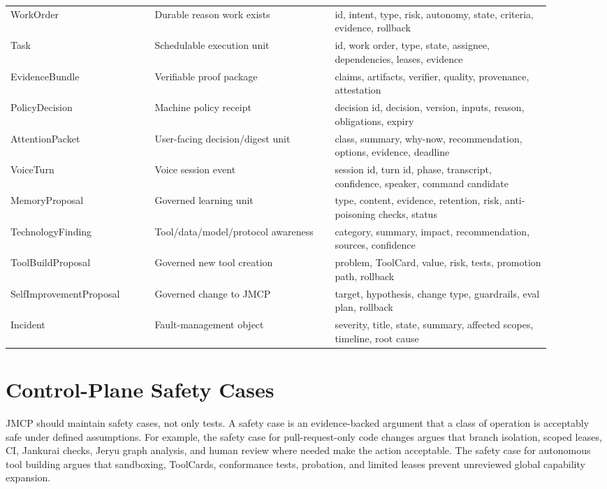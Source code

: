 \documentclass[10pt,journal,onecolumn]{IEEEtran}
\begin{document}
\begin{longtable}{@{}p{0.24\linewidth}p{0.30\linewidth}p{0.36\linewidth}@{}}
WorkOrder & Durable reason work exists & id, intent, type, risk, autonomy, state, criteria, evidence, rollback \\
Task & Schedulable execution unit & id, work order, type, state, assignee, dependencies, leases, evidence \\
EvidenceBundle & Verifiable proof package & claims, artifacts, verifier, quality, provenance, attestation \\
PolicyDecision & Machine policy receipt & decision id, decision, version, inputs, reason, obligations, expiry \\
AttentionPacket & User-facing decision/digest unit & class, summary, why-now, recommendation, options, evidence, deadline \\
VoiceTurn & Voice session event & session id, turn id, phase, transcript, confidence, speaker, command candidate \\
MemoryProposal & Governed learning unit & type, content, evidence, retention, risk, anti-poisoning checks, status \\
TechnologyFinding & Tool/data/model/protocol awareness & category, summary, impact, recommendation, sources, confidence \\
ToolBuildProposal & Governed new tool creation & problem, ToolCard, value, risk, tests, promotion path, rollback \\
SelfImprovementProposal & Governed change to JMCP & target, hypothesis, change type, guardrails, eval plan, rollback \\
Incident & Fault-management object & severity, title, state, summary, affected scopes, timeline, root cause \\
\bottomrule
\end{longtable}

\section{Control-Plane Safety Cases}
JMCP should maintain safety cases, not only tests. A safety case is an evidence-backed argument that a class of operation is acceptably safe under defined assumptions. For example, the safety case for pull-request-only code changes argues that branch isolation, scoped leases, CI, Jankurai checks, Jeryu graph analysis, and human review where needed make the action acceptable. The safety case for autonomous tool building argues that sandboxing, ToolCards, conformance tests, probation, and limited leases prevent unreviewed global capability expansion.
\end{document}
